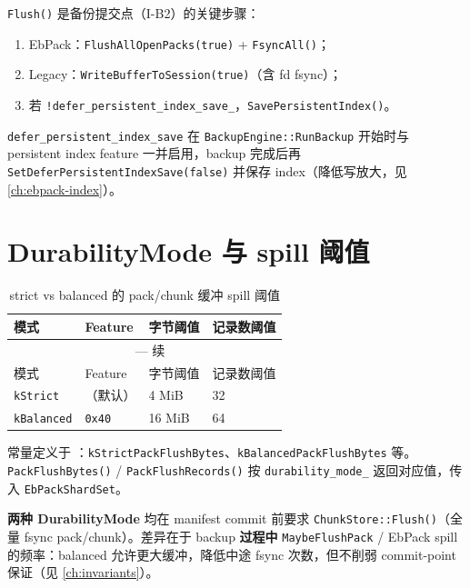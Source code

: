 \texttt{Flush()} 是备份提交点（I-B2）的关键步骤：

\begin{enumerate}[nosep]
  \item EbPack：\texttt{FlushAllOpenPacks(true)} + \texttt{FsyncAll()}；
  \item Legacy：\texttt{WriteBufferToSession(true)}（含 fd fsync）；
  \item 若 \texttt{!defer\_persistent\_index\_save\_}，\texttt{SavePersistentIndex()}。
\end{enumerate}

\texttt{defer\_persistent\_index\_save} 在 \texttt{BackupEngine::RunBackup} 开始时与 persistent index feature 一并启用，backup 完成后再 \texttt{SetDeferPersistentIndexSave(false)} 并保存 index（降低写放大，见 \cref{ch:ebpack-index}）。

\section{DurabilityMode 与 spill 阈值}

\begin{longtable}{@{}llll@{}}
\caption{strict vs balanced 的 pack/chunk 缓冲 spill 阈值} \\
\toprule
模式 & Feature & 字节阈值 & 记录数阈值 \\
\midrule
\endfirsthead
\multicolumn{4}{c}{\tablename\ \thetable{} — 续} \\
\toprule
模式 & Feature & 字节阈值 & 记录数阈值 \\
\midrule
\endhead
\texttt{kStrict} & （默认） & 4 MiB & 32 \\
\texttt{kBalanced} & \texttt{0x40} & 16 MiB & 64 \\
\bottomrule
\end{longtable}

常量定义于 ：\texttt{kStrictPackFlushBytes}、\texttt{kBalancedPackFlushBytes} 等。\texttt{PackFlushBytes()} / \texttt{PackFlushRecords()} 按 \texttt{durability\_mode\_} 返回对应值，传入 \texttt{EbPackShardSet}。

\begin{designbox}
\textbf{两种 DurabilityMode} 均在 manifest commit 前要求 \texttt{ChunkStore::Flush()}（全量 fsync pack/chunk）。差异在于 backup \textbf{过程中} \texttt{MaybeFlushPack} / EbPack spill 的频率：balanced 允许更大缓冲，降低中途 fsync 次数，但不削弱 commit-point 保证（见 \cref{ch:invariants}）。
\end{designbox}

